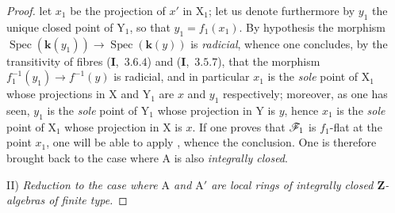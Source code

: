 \begin{proof}
let $x_1$ be the projection of $x'$ in $\mathrm{X}_1$; let us denote furthermore by $y_1$ the unique closed point
of $\mathrm{Y}_1$, so that $y_1=f_1(x_1)$. By hypothesis the morphism $\operatorname{Spec}(\boldsymbol{k}(y_1))\to\operatorname{Spec}(\boldsymbol{k}(y))$
is \emph{radicial}, whence one concludes, by the transitivity of fibres (\textbf{I},~$3.6.4$) and (\textbf{I},~$3.5.7$), that
the morphism $f_1^{-1}(y_1)\to f^{-1}(y)$ is radicial, and in particular $x_1$ is the \emph{sole} point of $\mathrm{X}_1$
whose projections in $\mathrm{X}$ and $\mathrm{Y}_1$ are $x$ and $y_1$ respectively; moreover, as one has seen, $y_1$
is the \emph{sole} point of $\mathrm{Y}_1$ whose projection in $\mathrm{Y}$ is $y$, hence $x_1$ is the \emph{sole} point of $\mathrm{X}_1$
whose projection in $\mathrm{X}$ is $x$. If one proves that $\mathscr{F}_1$ is $f_1$-flat at the point $x_1$, one will be able to
apply , whence the conclusion. One is therefore brought back to the case where $\mathrm{A}$
is also \emph{integrally closed}.

\medskip
\noindent II) \emph{Reduction to the case where $\mathrm{A}$ and $\mathrm{A}'$ are local rings of integrally closed $\mathbf{Z}$-algebras of finite type.}


\end{proof}
